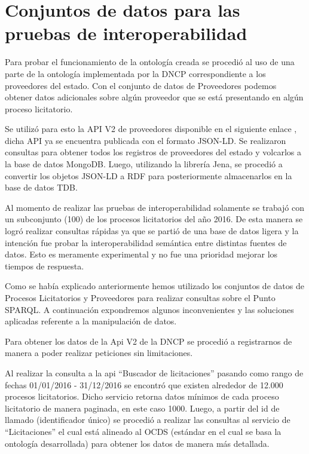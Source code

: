 \section{Conjuntos de datos para las pruebas de interoperabilidad}

Para probar el funcionamiento de la ontología creada se procedió al uso de una parte de la ontología implementada por la DNCP correspondiente a los proveedores del estado. Con el conjunto de datos de Proveedores podemos obtener datos adicionales sobre algún proveedor que se está presentando en algún proceso licitatorio.

Se utilizó para esto la API V2 de proveedores disponible en el siguiente enlace  , dicha API ya se encuentra publicada con el formato JSON-LD. Se realizaron consultas para obtener todos los registros de proveedores del estado y volcarlos a la base de datos MongoDB. Luego, utilizando la librería Jena, se procedió a convertir los objetos JSON-LD a RDF para posteriormente almacenarlos en la base de datos TDB.

Al momento de realizar las pruebas de interoperabilidad solamente se trabajó con un subconjunto (100) de los procesos licitatorios del año 2016. De esta manera se logró realizar consultas rápidas ya que se partió de una base de datos ligera y la intención fue probar la interoperabilidad semántica entre distintas fuentes de datos. Esto es meramente experimental y no fue una prioridad mejorar los tiempos de respuesta.

Como se había explicado anteriormente hemos utilizado los conjuntos de datos de Procesos Licitatorios y Proveedores para realizar consultas sobre el Punto SPARQL. A continuación expondremos algunos inconvenientes y las soluciones aplicadas referente a la manipulación de datos.

Para obtener los datos de la Api V2 de la DNCP se procedió a registrarnos de manera a poder realizar peticiones sin limitaciones.

Al realizar la consulta a la api “Buscador de licitaciones” pasando como rango de fechas 01/01/2016 - 31/12/2016 se encontró que existen alrededor de 12.000 procesos licitatorios.
Dicho servicio retorna datos mínimos de cada proceso licitatorio de manera paginada, en este caso 1000. Luego, a partir del id de llamado (identificador único) se procedió a realizar las consultas al servicio de “Licitaciones” el cual está alineado al OCDS (estándar en el cual se basa la ontología desarrollada) para obtener los datos de manera más detallada.

